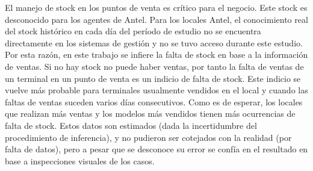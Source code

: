El manejo de stock en los puntos de venta es crítico para el negocio. Este stock es desconocido
para los agentes de Antel. Para los locales Antel, el conocimiento real del stock histórico en cada
día del período de estudio no se encuentra directamente en los sistemas de gestión y no se tuvo
acceso durante este estudio. Por esta razón, en este trabajo se infiere la falta de stock en base a la información de
ventas. Si no hay stock no puede haber ventas, por tanto la falta de ventas de un terminal en un
punto de venta es un indicio de falta de stock. Este indicio se vuelve más probable para terminales
usualmente vendidos en el local y cuando las faltas de ventas suceden varios días consecutivos.
Como es de esperar, los locales que realizan más ventas y los modelos más
vendidos tienen más ocurrencias de falta de stock. 
Estos datos son estimados (dada la incertidumbre del procedimiento de inferencia), 
y no pudieron ser cotejados con la realidad (por falta de datos), 
pero a pesar que se desconoce su error se confía en el resultado en base a inspecciones visuales de los casos.


